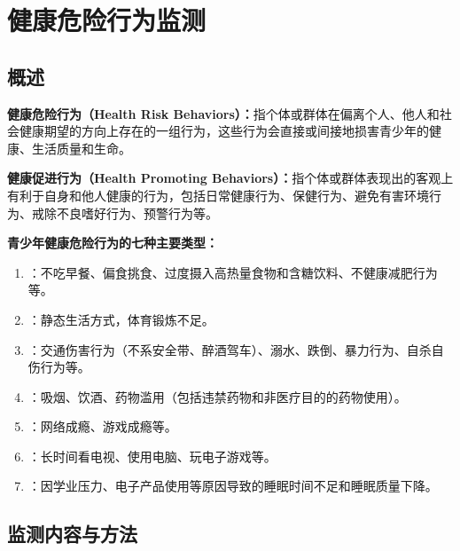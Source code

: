 \section{健康危险行为监测}

\subsection{概述}

\begin{defbox}
\textbf{健康危险行为（Health Risk Behaviors）：}指个体或群体在偏离个人、他人和社会健康期望的方向上存在的一组行为，这些行为会直接或间接地损害青少年的健康、生活质量和生命。

\textbf{健康促进行为（Health Promoting Behaviors）：}指个体或群体表现出的客观上有利于自身和他人健康的行为，包括日常健康行为、保健行为、避免有害环境行为、戒除不良嗜好行为、预警行为等。
\end{defbox}

\begin{keybox}
\textbf{青少年健康危险行为的七种主要类型：}

\begin{enumerate}[leftmargin=*]
    \item {}：不吃早餐、偏食挑食、过度摄入高热量食物和含糖饮料、不健康减肥行为等。
    \item {}：静态生活方式，体育锻炼不足。
    \item {}：交通伤害行为（不系安全带、醉酒驾车）、溺水、跌倒、暴力行为、自杀自伤行为等。
    \item {}：吸烟、饮酒、药物滥用（包括违禁药物和非医疗目的的药物使用）。
    \item {}：网络成瘾、游戏成瘾等。
    \item {}：长时间看电视、使用电脑、玩电子游戏等。
    \item {}：因学业压力、电子产品使用等原因导致的睡眠时间不足和睡眠质量下降。
\end{enumerate}
\end{keybox}

\subsection{监测内容与方法}

